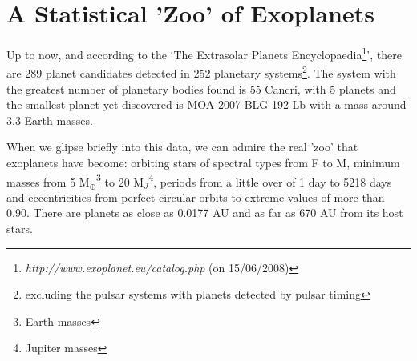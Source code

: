 \documentclass[dvips,12pt,a4paper]{report}
\begin{document}



\section {A Statistical 'Zoo' of Exoplanets}

\indent Up to now, and according to the `The Extrasolar Planets Encyclopaedia\footnote{\textit{http://www.exoplanet.eu/catalog.php} (on 15/06/2008)}', there are 289 planet candidates detected in 252 planetary systems\footnote{excluding the pulsar systems with planets detected by pulsar timing}. The system with the greatest number of planetary bodies found is 55 Cancri, with 5 planets \citep{Fischer-2008} and the smallest planet yet discovered is MOA-2007-BLG-192-Lb \citep{Bennett-2008} with a mass around 3.3 Earth masses.

When we glipse briefly into this data, we can admire the real 'zoo' that exoplanets have become: orbiting stars of spectral types from F to M, minimum masses from 5 M$_{\oplus}$\footnote{Earth masses} to 20 M$_J$\footnote{Jupiter masses}, periods from a little over of 1 day to 5218 days and eccentricities from perfect circular orbits to extreme values of more than 0.90. There are planets as close as 0.0177 AU and as far as 670 AU from its host stars.
\end{document}
